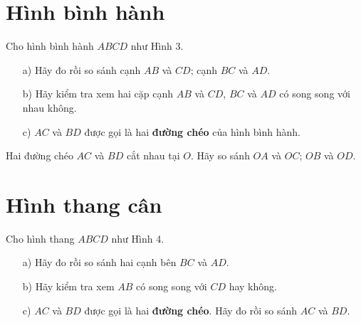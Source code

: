 \documentclass[12pt]{article}
\begin{document}
\section{Hình bình hành}
\begin{paracol}{2}
Cho hình bình hành \(ABCD\) như Hình 3.
\begin{itemize}
  \item[a)] Hãy đo rồi so sánh cạnh \(AB\) và \(CD\); cạnh \(BC\) và \(AD\).
  \item[b)] Hãy kiểm tra xem hai cặp cạnh \(AB\) và \(CD\), \(BC\) và \(AD\) có song song với nhau không.
  \item[c)] \(AC\) và \(BD\) được gọi là hai \textbf{đường chéo} của hình bình hành.
\end{itemize}
Hai đường chéo \(AC\) và \(BD\) cắt nhau tại \(O\). Hãy so sánh \(OA\) và \(OC\); \(OB\) và \(OD\).
\switchcolumn
\begin{center}
\end{center}
\end{paracol}
\newpage
\section{Hình thang cân}
\begin{paracol}{2}
Cho hình thang \(ABCD\) như Hình 4.
\begin{itemize}
  \item[a)] Hãy đo rồi so sánh hai cạnh bên \(BC\) và \(AD\).
  \item[b)] Hãy kiểm tra xem \(AB\) có song song với \(CD\) hay không.
  \item[c)] \(AC\) và \(BD\) được gọi là hai \textbf{đường chéo}. Hãy đo rồi so sánh \(AC\) và \(BD\).
\end{itemize}
\switchcolumn
\begin{center}
\end{center}
\end{paracol}
\end{document}
